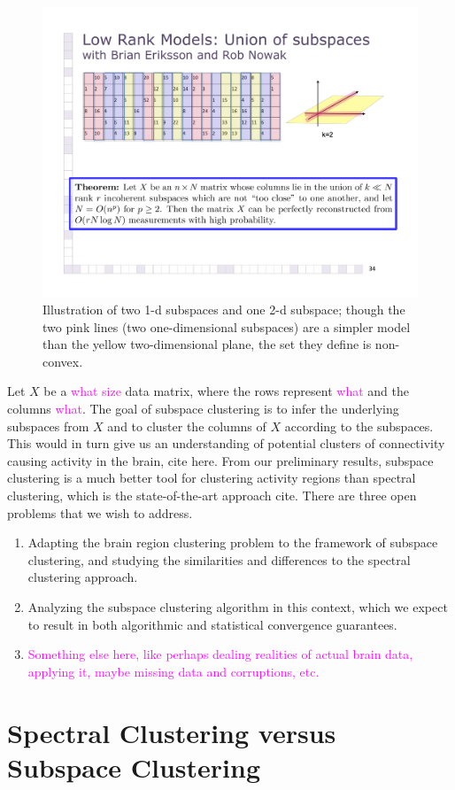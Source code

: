 \documentclass[times,11pt]{article} %
\newcommand{\laura}{\textcolor{magenta}}
\begin{document}
\begin{figure}
\centering
\includegraphics[width=.4\textwidth]{figs/unionspic}
\caption{\small Illustration of two 1-d subspaces and one 2-d subspace; though the two pink lines (two one-dimensional subspaces) are a simpler model than the yellow two-dimensional plane, the set they define is non-convex.}
\label{fig:unionsum}
\end{figure}


Let $X$ be a \laura{what size} data matrix, where the rows represent \laura{what} and the columns \laura{what}. 
The goal of subspace clustering is to infer the underlying subspaces from $X$ and to cluster the columns of $X$ according to the subspaces. This would in turn give us an understanding of potential clusters of connectivity causing activity in the brain, cite here. From our preliminary results, subspace clustering is a much better tool for clustering activity regions than spectral clustering, which is the state-of-the-art approach cite. There are three open problems that we wish to address. 

\begin{enumerate}
\item Adapting the brain region clustering problem to the framework of subspace clustering, and studying the similarities and differences to the spectral clustering approach.
\item Analyzing the subspace clustering algorithm in this context, which we expect to result in both algorithmic and statistical convergence guarantees.
\item \laura{Something else here, like perhaps dealing realities of actual brain data, applying it, maybe missing data and corruptions, etc.}
\end{enumerate}

\section{Spectral Clustering versus Subspace Clustering}
\end{document}
